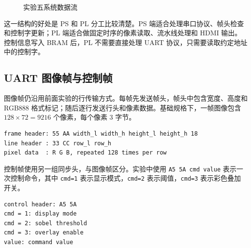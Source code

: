 \documentclass[12pt,a4paper]{ctexart}
\begin{document}
\begin{figure}[H]
\centering
{}
\caption{实验五系统数据流}
\label{fig:system-flow}
\end{figure}

这一结构的好处是 PS 和 PL 分工比较清楚。PS 端适合处理串口协议、帧头检查和控制字更新；PL 端适合做固定时序的像素读取、流水线处理和 HDMI 输出。控制信息写入 BRAM 后，PL 不需要直接处理 UART 协议，只需要读取约定地址中的控制字。

\subsection{UART 图像帧与控制帧}

图像帧仍沿用前面实验的行传输方式。每帧先发送帧头，帧头中包含宽度、高度和 RGB888 格式标记；随后逐行发送行头和像素数据。基础规格下，一帧图像包含 $128 \times 72 = 9216$ 个像素，每个像素 3 字节。

\begin{lstlisting}[language={},caption={UART 图像帧格式}]
frame header: 55 AA width_l width_h height_l height_h 18
line header : 33 CC row_l row_h
pixel data  : R G B, repeated 128 times per row
\end{lstlisting}

控制帧使用另一组同步头，与图像帧区分。实验中使用 \verb|A5 5A cmd value| 表示一次控制命令，其中 \verb|cmd=1| 表示显示模式，\verb|cmd=2| 表示阈值，\verb|cmd=3| 表示彩色叠加开关。

\begin{lstlisting}[language={},caption={UART 控制帧格式}]
control header: A5 5A
cmd = 1: display mode
cmd = 2: sobel threshold
cmd = 3: overlay enable
value: command value
\end{lstlisting}
\end{document}
